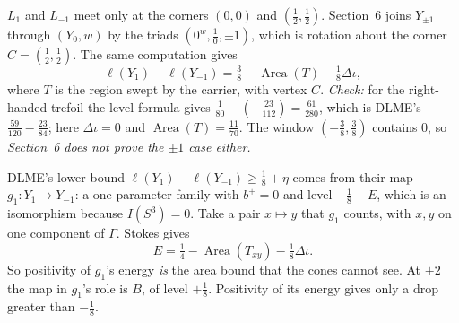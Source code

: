 \documentclass[10pt]{amsart}
\begin{document}
$L_1$ and $L_{-1}$ meet only at the corners $(0,0)$ and $(\frac12,\frac12)$. Section~6
joins $Y_{\pm1}$ through $(Y_0,w)$ by the triads $(0^w,\frac10,\pm1)$, which is
rotation about the corner $C=(\frac12,\frac12)$. The same computation gives
\[
\ell(Y_1)-\ell(Y_{-1})=\tfrac38-\operatorname{Area}(T)-\tfrac18\Delta\iota ,
\]
where $T$ is the region swept by the carrier, with vertex $C$. \emph{Check:} for the
right-handed trefoil the level formula gives $\frac1{80}-(-\frac{23}{112})=\frac{61}{280}$,
which is DLME's $\frac{59}{120}-\frac{23}{84}$; here $\Delta\iota=0$ and $\operatorname{Area}(T)=\frac{11}{70}$.
The window $(-\frac38,\frac38)$ contains $0$, so \emph{Section~6 does not prove the
$\pm1$ case either.}

DLME's lower bound $\ell(Y_1)-\ell(Y_{-1})\ge\frac18+\eta$ comes from their map
$g_1\colon Y_1\to Y_{-1}$: a one-parameter family with $b^+=0$ and level $-\frac18-E$, which is
an isomorphism because $I(S^3)=0$. Take a pair $x\mapsto y$ that $g_1$ counts, with
$x,y$ on one component of $\Gamma$. Stokes gives
\[
E=\tfrac14-\operatorname{Area}(T_{xy})-\tfrac18\Delta\iota .
\]
So positivity of $g_1$'s energy \emph{is} the area bound that the cones cannot see.
At $\pm2$ the map in $g_1$'s role is $B$, of level $+\frac18$. Positivity of its
energy gives only a drop greater than $-\frac18$.
\end{document}
